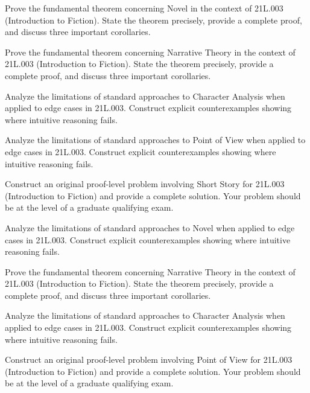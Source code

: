 \documentclass[12pt,a4paper]{exam}
\begin{document}
\begin{questions}
\vspace{0.3cm}

\question[5]
Prove the fundamental theorem concerning Novel in the context of 21L.003 (Introduction to Fiction). State the theorem precisely, provide a complete proof, and discuss three important corollaries.

\vspace{0.3cm}

\question[3]
Prove the fundamental theorem concerning Narrative Theory in the context of 21L.003 (Introduction to Fiction). State the theorem precisely, provide a complete proof, and discuss three important corollaries.

\vspace{0.3cm}

\question[4]
Analyze the limitations of standard approaches to Character Analysis when applied to edge cases in 21L.003. Construct explicit counterexamples showing where intuitive reasoning fails.

\vspace{0.3cm}

\question[5]
Analyze the limitations of standard approaches to Point of View when applied to edge cases in 21L.003. Construct explicit counterexamples showing where intuitive reasoning fails.

\vspace{0.3cm}

\question[3]
Construct an original proof-level problem involving Short Story for 21L.003 (Introduction to Fiction) and provide a complete solution. Your problem should be at the level of a graduate qualifying exam.

\vspace{0.3cm}

\question[5]
Analyze the limitations of standard approaches to Novel when applied to edge cases in 21L.003. Construct explicit counterexamples showing where intuitive reasoning fails.

\vspace{0.3cm}

\question[4]
Prove the fundamental theorem concerning Narrative Theory in the context of 21L.003 (Introduction to Fiction). State the theorem precisely, provide a complete proof, and discuss three important corollaries.

\vspace{0.3cm}

\question[5]
Analyze the limitations of standard approaches to Character Analysis when applied to edge cases in 21L.003. Construct explicit counterexamples showing where intuitive reasoning fails.

\vspace{0.3cm}

\question[3]
Construct an original proof-level problem involving Point of View for 21L.003 (Introduction to Fiction) and provide a complete solution. Your problem should be at the level of a graduate qualifying exam.

\vspace{0.3cm}

\end{questions}
\end{document}
